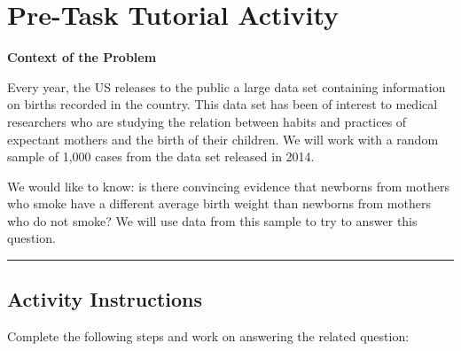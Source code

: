\documentclass[oneside,openany]{book}
\begin{document}
\section{Pre-Task Tutorial Activity}\label{pre-task-tutorial-activity-4}

\textbf{Context of the Problem}\label{context-of-the-problem-1}

Every year, the US releases to the public a large data set containing information on births recorded in the country. This data set has been of interest to medical researchers who are studying the relation between habits and practices of expectant mothers and the birth of their children. We will work with a random sample of 1,000 cases from the data set released in 2014.

We would like to know: is there convincing evidence that newborns from mothers who smoke have a different average birth weight than newborns from mothers who do not smoke? We will use data from this sample to try to answer this question.

\begin{center}\rule{0.5\linewidth}{0.5pt}\end{center}

\subsection{Activity Instructions}\label{activity-instructions-3}

Complete the following steps and work on answering the related question:
\end{document}
